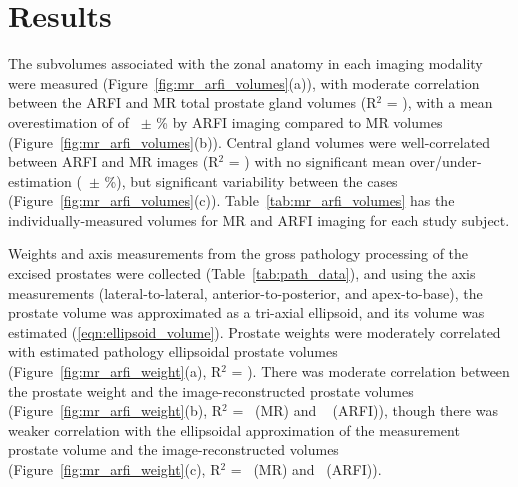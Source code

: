 \section{Results}\label{sect:results}
The subvolumes associated with the zonal anatomy in each imaging modality were
measured (Figure~\ref{fig:mr_arfi_volumes}(a)), with moderate correlation
between the ARFI and MR total prostate gland volumes (R$^2$ =
\MRarfiVolTotalRsq), with a mean overestimation of of
\MRarfiVolTotalMeanDiff~$\pm$ \MRarfiVolTotalStdDiff\% by ARFI imaging compared
to MR volumes (Figure~\ref{fig:mr_arfi_volumes}(b)).  Central gland volumes
were well-correlated between ARFI and MR images (R$^2$ = \MRarfiVolCentralRsq)
with no significant mean over/under-estimation (\MRarfiVolCentralMeanDiff~$\pm$
\MRarfiVolCentralStdDiff\%), but significant variability between the cases
(Figure~\ref{fig:mr_arfi_volumes}(c)).  Table~\ref{tab:mr_arfi_volumes} has the
individually-measured volumes for MR and ARFI imaging for each study subject.



Weights and axis measurements from the gross pathology processing of the
excised prostates were collected (Table~\ref{tab:path_data}), and using the
axis measurements (lateral-to-lateral, anterior-to-posterior, and
apex-to-base), the prostate volume was approximated as a tri-axial ellipsoid,
and its volume was estimated (\ref{eqn:ellipsoid_volume}).  Prostate weights
were moderately correlated with estimated pathology ellipsoidal prostate
volumes (Figure~\ref{fig:mr_arfi_weight}(a), R$^2$ = \pathVolWeightRsq).  There
was moderate correlation between the prostate weight and the
image-reconstructed prostate volumes (Figure~\ref{fig:mr_arfi_weight}(b), R$^2$
= \weightMRrsq~(MR) and \weightARFIrsq~ (ARFI)), though there was weaker
correlation with the ellipsoidal approximation of the measurement prostate
volume and the image-reconstructed volumes (Figure~\ref{fig:mr_arfi_weight}(c),
R$^2$ = \pathVolMRrsq~(MR) and \pathVolARFIrsq~(ARFI)).  



